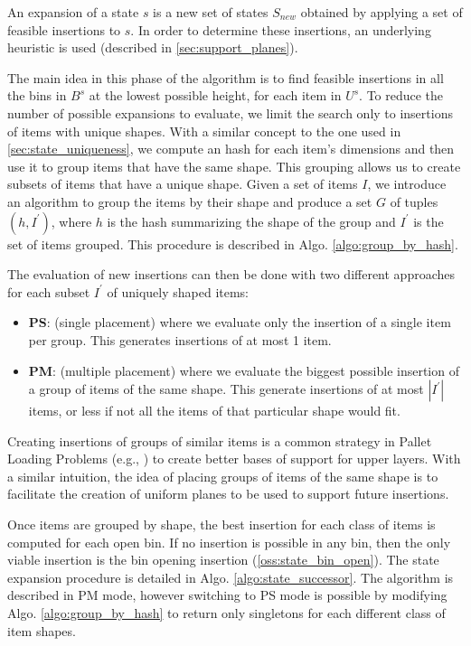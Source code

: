 An expansion of a state $s$ is a new set of states $S_{new}$ obtained by applying a set of feasible insertions to $s$. In order to determine these insertions, an underlying heuristic is used (described in \cref{sec:support_planes}).

The main idea in this phase of the algorithm is to find feasible insertions in all the bins in $B^s$ at the lowest possible height, for each item in $U^s$. 
To reduce the number of possible expansions to evaluate, we limit the search only to insertions of items with unique shapes.
With a similar concept to the one used in \cref{sec:state_uniqueness}, we compute an hash for each item's dimensions and then use it to group items that have the same shape.
This grouping allows us to create subsets of items that have a unique shape. 
Given a set of items $I$, we introduce an algorithm to group the items by their shape and produce a set $G$ of tuples $(h, I^\prime)$, where $h$ is the hash summarizing the shape of the group and $I^\prime$ is the set of items grouped. This procedure is described in Algo. \ref{algo:group_by_hash}.

The evaluation of new insertions can then be done with two different approaches for each subset $I^\prime$ of uniquely shaped items:
\begin{itemize}
    \label{def:placement_modes}%
    \item \textbf{PS}: (single placement) where we evaluate only the insertion of a single item per group. This generates insertions of at most 1 item.
    \item \textbf{PM}: (multiple placement) where we evaluate the biggest possible insertion of a group of items of the same shape. This generate insertions of at most $|I^\prime|$ items, or less if not all the items of that particular shape would fit.
\end{itemize}
Creating insertions of groups of similar items is a common strategy in Pallet Loading Problems (e.g., \cite{elhedhli2019three}) to create better bases of support for upper layers.
With a similar intuition, the idea of placing groups of items of the same shape is to facilitate the creation of uniform planes to be used to support future insertions.

Once items are grouped by shape, the best insertion for each class of items is computed for each open bin. If no insertion is possible in any bin, then the only viable insertion is the bin opening insertion (\cref{oss:state_bin_open}).
The state expansion procedure is detailed in Algo. \ref{algo:state_successor}. The algorithm is described in PM mode, however switching to PS mode is possible by modifying Algo. \ref{algo:group_by_hash} to return only singletons for each different class of item shapes.

